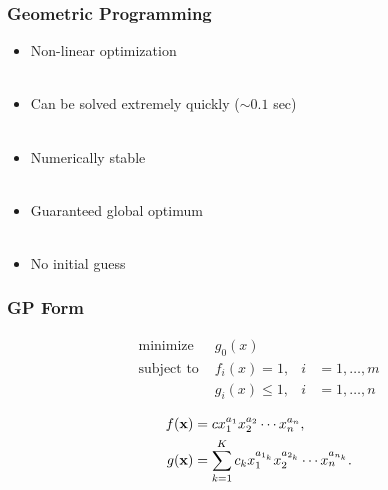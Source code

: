 \documentclass{beamer}
\begin{document}
\begin{frame}
    \frametitle{Geometric Programming}
    \begin{itemize}
        \pause
        \item Non-linear optimization \\~\\
        \pause
        \item Can be solved extremely quickly ($\sim 0.1$ sec)\\~\\
        \pause
        \item Numerically stable \\~\\
        \pause
        \item Guaranteed global optimum \\~\\
        \pause
        \item No initial guess
        \end{itemize}
\end{frame}

\begin{frame}
    \frametitle{GP Form}

        \begin{align*}
            \text{minimize } &g_0(x) \\
            \text{subject to } &f_i(x) = 1, &i &= 1,\dots,m\\
                               &g_i(x) \leq 1, &i &= 1,\dots,n
        \end{align*}

        \begin{align*}
            f(\bold{x}) &= c x_1^{a_1} x_2^{a_2} \dotsm x_n^{a_n} , \\
            g(\bold{x}) &= \displaystyle\sum_{k=1}^K c_k x_1^{a_{1_k}} x_2^{a_{2_k}} \dotsm x_n^{a_{n_k}}.
        \end{align*}

\end{frame}
\end{document}
